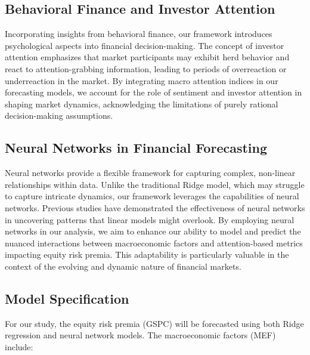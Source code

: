 \documentclass{article}
\begin{document}
\subsection{Behavioral Finance and Investor Attention}

Incorporating insights from behavioral finance, our framework introduces psychological aspects into financial decision-making. The concept of investor attention emphasizes that market participants may exhibit herd behavior and react to attention-grabbing information, leading to periods of overreaction or underreaction in the market. By integrating macro attention indices in our forecasting models, we account for the role of sentiment and investor attention in shaping market dynamics, acknowledging the limitations of purely rational decision-making assumptions.

\subsection{Neural Networks in Financial Forecasting}

Neural networks provide a flexible framework for capturing complex, non-linear relationships within data. Unlike the traditional Ridge model, which may struggle to capture intricate dynamics, our framework leverages the capabilities of neural networks. Previous studies have demonstrated the effectiveness of neural networks in uncovering patterns that linear models might overlook. By employing neural networks in our analysis, we aim to enhance our ability to model and predict the nuanced interactions between macroeconomic factors and attention-based metrics impacting equity risk premia. This adaptability is particularly valuable in the context of the evolving and dynamic nature of financial markets.

\subsection{Model Specification}

For our study, the equity risk premia (GSPC) will be forecasted using both Ridge regression and neural network models. The macroeconomic factors (MEF) include:
\end{document}
